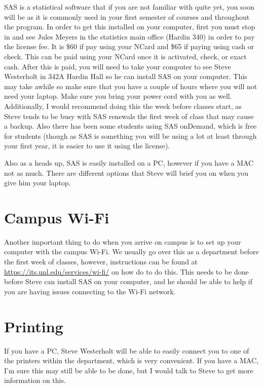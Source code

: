 \documentclass[
  12pt,
]{book}
\begin{document}
SAS is a statistical software that if you are not familiar with quite yet, you soon will be as it is commonly used in your first semester of courses and throughout the program. In order to get this installed on your computer, first you must stop in and see Jules Meyers in the statistics main office (Hardin 340) in order to pay the license fee. It is \(\$60\) if pay using your NCard and \$65 if paying using cash or check. This can be paid using your NCard once it is activated, check, or exact cash. After this is paid, you will need to take your computer to see Steve Westerholt in 342A Hardin Hall so he can install SAS on your computer. This may take awhile so make sure that you have a couple of hours where you will not need your laptop. Make sure you bring your power cord with you as well. Additionally, I would recommend doing this the week before classes start, as Steve tends to be busy with SAS renewals the first week of class that may cause a backup. Also there has been some students using SAS onDemand, which is free for students (though as SAS is something you will be using a lot at least through your first year, it is easier to use it using the license).

Also as a heads up, SAS is easily installed on a PC, however if you have a MAC not as much. There are different options that Steve will brief you on when you give him your laptop.

\hypertarget{campus-wi-fi}{%
\section{Campus Wi-Fi}\label{campus-wi-fi}}

Another important thing to do when you arrive on campus is to set up your computer with the campus Wi-Fi. We usually go over this as a department before the first week of classes, however, instructions can be found at \url{https://its.unl.edu/services/wi-fi/} on how do to do this. This needs to be done before Steve can install SAS on your computer, and he should be able to help if you are having issues connecting to the Wi-Fi network.

\hypertarget{printing}{%
\section{Printing}\label{printing}}

If you have a PC, Steve Westerholt will be able to easily connect you to one of the printers within the department, which is very convenient. If you have a MAC, I'm sure this may still be able to be done, but I would talk to Steve to get more information on this.
\end{document}
